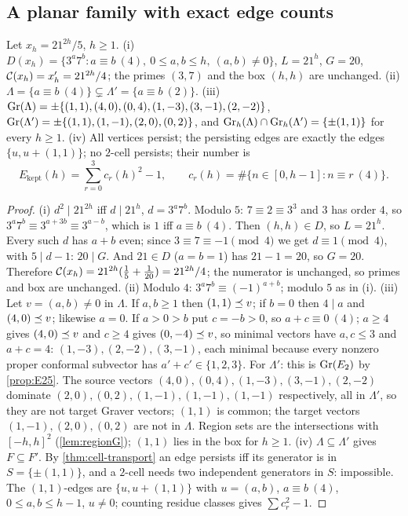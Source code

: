 \subsection{A planar family with exact edge counts}
\begin{theorem}\label{thm:P2TF1}
Let $x_h=21^{2h}/5$, $h\ge1$. (i) $D(x_h)=\{3^a7^b:a\equiv b\ (4),\ 0\le a,b\le h,\ (a,b)\ne0\}$, $L=21^h$, $G=20$, $\mathcal C(x_h)=x_h'=21^{2h}/4$; the primes $(3,7)$ and the box $(h,h)$ are unchanged. (ii) $\Lambda=\{a\equiv b\ (4)\}\subsetneq\Lambda'=\{a\equiv b\ (2)\}$. (iii) $\operatorname{Gr}(\Lambda)=\pm\{(1,1),(4,0),(0,4),(1,-3),(3,-1),(2,-2)\}$, $\operatorname{Gr}(\Lambda')=\pm\{(1,1),(1,-1),(2,0),(0,2)\}$, and $\operatorname{Gr}_h(\Lambda)\cap\operatorname{Gr}_h(\Lambda')=\{\pm(1,1)\}$ for every $h\ge1$. (iv) All vertices persist; the persisting edges are exactly the edges $\{u,u+(1,1)\}$; no $2$-cell persists; their number is
\[
E_{\mathrm{kept}}(h)=\sum_{r=0}^3c_r(h)^2-1,\qquad c_r(h)=\#\{n\in[0,h-1]:n\equiv r\ (4)\}.
\]
\end{theorem}
\begin{proof}
(i) $d^2\mid21^{2h}$ iff $d\mid21^h$, $d=3^a7^b$. Modulo $5$: $7\equiv2\equiv3^3$ and $3$ has order $4$, so $3^a7^b\equiv3^{a+3b}\equiv3^{a-b}$, which is $1$ iff $a\equiv b\ (4)$. Then $(h,h)\in D$, so $L=21^h$. Every such $d$ has $a+b$ even; since $3\equiv7\equiv-1\pmod4$ we get $d\equiv1\pmod4$, with $5\mid d-1$: $20\mid G$. And $21\in D$ ($a=b=1$) has $21-1=20$, so $G=20$. Therefore $\mathcal C(x_h)=21^{2h}(\tfrac15+\tfrac1{20})=21^{2h}/4$; the numerator is unchanged, so primes and box are unchanged. (ii) Modulo $4$: $3^a7^b\equiv(-1)^{a+b}$; modulo $5$ as in (i). (iii) Let $v=(a,b)\ne0$ in $\Lambda$. If $a,b\ge1$ then $(1,1)\preceq v$; if $b=0$ then $4\mid a$ and $(4,0)\preceq v$; likewise $a=0$. If $a>0>b$ put $c=-b>0$, so $a+c\equiv0\ (4)$; $a\ge4$ gives $(4,0)\preceq v$ and $c\ge4$ gives $(0,-4)\preceq v$, so minimal vectors have $a,c\le3$ and $a+c=4$: $(1,-3),(2,-2),(3,-1)$, each minimal because every nonzero proper conformal subvector has $a'+c'\in\{1,2,3\}$. For $\Lambda'$: this is $\operatorname{Gr}(E_2)$ by \cref{prop:E25}. The source vectors $(4,0),(0,4),(1,-3),(3,-1),(2,-2)$ dominate $(2,0),(0,2),(1,-1),(1,-1),(1,-1)$ respectively, all in $\Lambda'$, so they are not target Graver vectors; $(1,1)$ is common; the target vectors $(1,-1),(2,0),(0,2)$ are not in $\Lambda$. Region sets are the intersections with $[-h,h]^2$ (\cref{lem:regionG}); $(1,1)$ lies in the box for $h\ge1$. (iv) $\Lambda\subseteq\Lambda'$ gives $F\subseteq F'$. By \cref{thm:cell-transport} an edge persists iff its generator is in $S=\{\pm(1,1)\}$, and a $2$-cell needs two independent generators in $S$: impossible. The $(1,1)$-edges are $\{u,u+(1,1)\}$ with $u=(a,b)$, $a\equiv b\ (4)$, $0\le a,b\le h-1$, $u\ne0$; counting residue classes gives $\sum c_r^2-1$. \qedhere
\end{proof}
